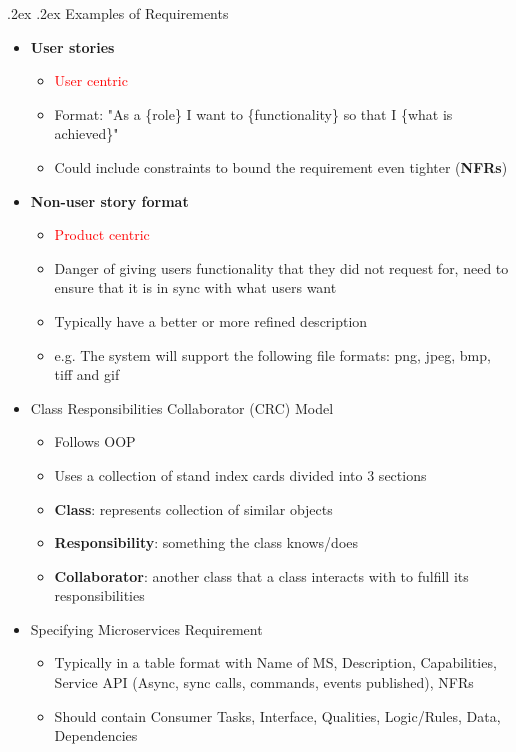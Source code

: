 \documentclass[10pt,landscape,a4paper]{article}
\makeatletter
\renewcommand{\subsubsection}{\@startsection{subsubsection}{1}{0mm}%
	{.2ex}%
	{.2ex}%
	{\rmfamily\bfseries}}
\makeatother
\begin{document}
\begin{multicols*}{4}
		\subsubsection{Examples of Requirements}
		\begin{itemize}
			\item \textbf{User stories} 
			\begin{itemize}
				\item \textcolor{red}{User centric}
				\item Format:  "As a \{role\} I want to \{functionality\} so that I \{what is achieved\}"
				\item Could include constraints to bound the requirement even tighter (\textbf{NFRs})
			\end{itemize}
			\item \textbf{Non-user story format}
			\begin{itemize}
				\item \textcolor{red}{Product centric}
				\item Danger of giving users functionality that they did not request for, need to ensure that it is in sync with what users want
				\item Typically have a better or more refined description
				\item e.g. The system will support the following file formats: png, jpeg, bmp, tiff
				and gif
			\end{itemize}
			\item Class Responsibilities Collaborator (CRC) Model
			\begin{itemize}
				\item Follows OOP
				\item Uses a collection of stand index cards divided into 3 sections
				\item \textbf{Class}: represents collection of similar objects
				\item \textbf{Responsibility}: something the class knows/does
				\item \textbf{Collaborator}: another class that a class
				interacts with to fulfill its responsibilities
			\end{itemize}
			\item Specifying Microservices Requirement
			\begin{itemize}
				\item Typically in a table format with Name of MS, Description, Capabilities, Service API (Async, sync calls, commands, events published), NFRs
				\item Should contain Consumer Tasks, Interface, Qualities, Logic/Rules, Data, Dependencies
			\end{itemize}
		\end{itemize}

\end{multicols*}
\end{document}
